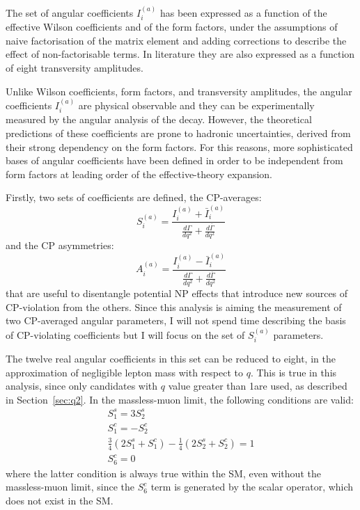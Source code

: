The set of angular coefficients $I_i^{(a)}$ has been expressed as a function of the effective Wilson coefficients and of the form factors, under the assumptions of naive factorisation of the matrix element and adding corrections to describe the effect of non-factorisable terms.
In literature they are also expressed as a function of eight \Ks transversity amplitudes.

Unlike Wilson coefficients, form factors, and transversity amplitudes, the angular coefficients $I_i^{(a)}$ are physical observable and they can be experimentally measured by the angular analysis of the \BtoKstmumudecay decay.
However, the theoretical predictions of these coefficients are prone to hadronic uncertainties, derived from their strong dependency on the form factors.
For this reasons, more sophisticated bases of angular coefficients have been defined in order to be independent from form factors at leading order of the effective-theory expansion.

Firstly, two sets of coefficients are defined, the CP-averages:
\begin{equation}
  S^{(a)}_i = \frac{ I^{(a)}_i + \bar I^{(a)}_i }{\frac{d\Gamma}{dq^2} + \frac{d\bar\Gamma}{dq^2}}
  \label{eq:Ss}
\end{equation}
and the CP asymmetries:
\begin{equation}
  A^{(a)}_i = \frac{ I^{(a)}_i - \bar I^{(a)}_i }{\frac{d\Gamma}{dq^2}+\frac{d\bar\Gamma}{dq^2}}
  \label{eq:As}
\end{equation}
that are useful to disentangle potential NP effects that introduce new sources of CP-violation from the others.
Since this analysis is aiming the measurement of two CP-averaged angular parameters, I will not spend time describing the basis of CP-violating coefficients but I will focus on the set of $S^{(a)}_i$ parameters.

The twelve real angular coefficients in this set can be reduced to eight, in the approximation of negligible lepton mass with respect to $q$.
This is true in this analysis, since only candidates with $q$ value greater than 1\GeV are used, as described in Section~\ref{sec:q2}.
In the massless-muon limit, the following conditions are valid:
\begin{gather}
  S_1^s = 3 S_2^s \nonumber\\
  S_1^c = - S_2^c \nonumber\\
  \frac{3}{4}\left(2S_1^s+S_1^c\right)-\frac{1}{4}\left(2S_2^s+S_2^c\right) = 1 \nonumber\\
  S_6^c = 0 \label{eq:massless-reductions}
\end{gather}
where the latter condition is always true within the SM, even without the massless-muon limit, since the $S_6^c$ term is generated by the scalar operator, which does not exist in the SM.

